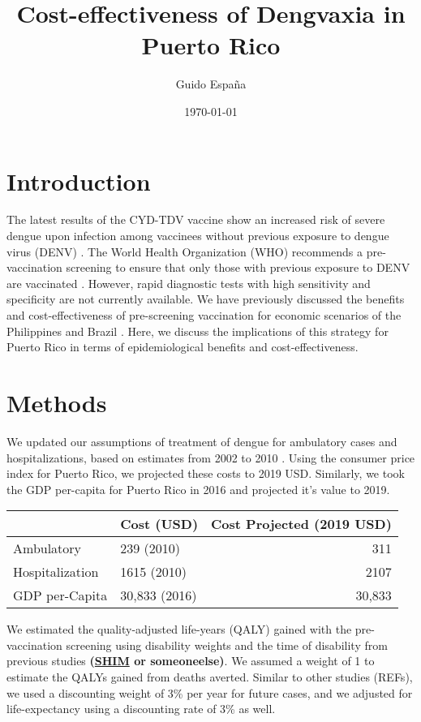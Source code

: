 \documentclass[11pt]{article}
\author{Guido España}
\date{\today}
\title{Cost-effectiveness of Dengvaxia in Puerto Rico}
\begin{document}
\maketitle

\section{Introduction}
\label{sec:orgf018ca5}
The latest results of the CYD-TDV vaccine show an increased risk of severe dengue upon infection among vaccinees without previous exposure to dengue virus (DENV) \cite{Sridhar2018}. The World Health Organization (WHO) recommends a pre-vaccination screening to ensure that only those with previous exposure to DENV are vaccinated \cite{WHO2018}. However, rapid diagnostic tests with high sensitivity and specificity are not currently available. We have previously discussed the benefits and cost-effectiveness of pre-screening vaccination for economic scenarios of the Philippines and Brazil \cite{Espana2019Biorxiv}. Here, we discuss the implications of this strategy for Puerto Rico in terms of epidemiological benefits and cost-effectiveness. 

\section{Methods}
\label{sec:org904a131}
We updated our assumptions of treatment of dengue for ambulatory cases and hospitalizations, based on estimates from 2002 to 2010 \cite{Halasa2012}. Using the consumer price index for Puerto Rico, we projected these costs to 2019 USD. Similarly, we took the GDP per-capita for Puerto Rico in 2016 \cite{worldbank2016} and projected it's value to 2019. 

\begin{center}
\begin{tabular}{llr}
\hline
 & Cost (USD) & Cost Projected (2019 USD)\\
\hline
Ambulatory & 239 (2010) & 311\\
Hospitalization & 1615 (2010) & 2107\\
GDP per-Capita & 30,833 (2016) & 30,833\\
\hline
\end{tabular}
\end{center}

We estimated the quality-adjusted life-years (QALY) gained with the pre-vaccination screening using disability weights and the time of disability from previous studies \textbf{(\url{SHIM} or someoneelse)}. We assumed a weight of 1 to estimate the QALYs gained from deaths averted. Similar to other studies (REFs), we used a discounting weight of 3\% per year for future cases, and we adjusted for life-expectancy using a discounting rate of 3\% as well. 
\end{document}
